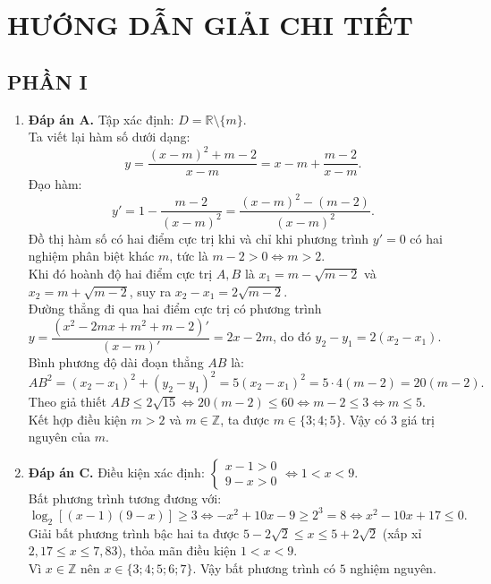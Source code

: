 \documentclass[12pt,a4paper]{article}
\begin{document}
\newpage
\section*{HƯỚNG DẪN GIẢI CHI TIẾT}

\subsection*{PHẦN I}
\begin{enumerate}[label=\textbf{Câu \arabic*:}, leftmargin=*]

\item \textbf{Đáp án A.}
Tập xác định: $D = \mathbb{R} \setminus \{m\}$.\\
Ta viết lại hàm số dưới dạng:
$$y = \dfrac{(x - m)^2 + m - 2}{x - m} = x - m + \dfrac{m - 2}{x - m}.$$
Đạo hàm:
$$y' = 1 - \dfrac{m - 2}{(x - m)^2} = \dfrac{(x - m)^2 - (m - 2)}{(x - m)^2}.$$
Đồ thị hàm số có hai điểm cực trị khi và chỉ khi phương trình $y' = 0$ có hai nghiệm phân biệt khác $m$, tức là $m - 2 > 0 \iff m > 2$.\\
Khi đó hoành độ hai điểm cực trị $A, B$ là $x_1 = m - \sqrt{m - 2}$ và $x_2 = m + \sqrt{m - 2}$, suy ra $x_2 - x_1 = 2\sqrt{m - 2}$.\\
Đường thẳng đi qua hai điểm cực trị có phương trình $y = \dfrac{(x^2 - 2mx + m^2 + m - 2)'}{(x - m)'} = 2x - 2m$, do đó $y_2 - y_1 = 2(x_2 - x_1)$.\\
Bình phương độ dài đoạn thẳng $AB$ là:
$$AB^2 = (x_2 - x_1)^2 + (y_2 - y_1)^2 = 5(x_2 - x_1)^2 = 5 \cdot 4(m - 2) = 20(m - 2).$$
Theo giả thiết $AB \le 2\sqrt{15} \iff 20(m - 2) \le 60 \iff m - 2 \le 3 \iff m \le 5$.\\
Kết hợp điều kiện $m > 2$ và $m \in \mathbb{Z}$, ta được $m \in \{3; 4; 5\}$. Vậy có $3$ giá trị nguyên của $m$.

\item \textbf{Đáp án C.}
Điều kiện xác định: $\begin{cases} x - 1 > 0 \\ 9 - x > 0 \end{cases} \iff 1 < x < 9$.\\
Bất phương trình tương đương với:
$$\log_2\left[(x - 1)(9 - x)\right] \ge 3 \iff -x^2 + 10x - 9 \ge 2^3 = 8 \iff x^2 - 10x + 17 \le 0.$$
Giải bất phương trình bậc hai ta được $5 - 2\sqrt{2} \le x \le 5 + 2\sqrt{2}$ (xấp xỉ $2{,}17 \le x \le 7{,}83$), thỏa mãn điều kiện $1 < x < 9$.\\
Vì $x \in \mathbb{Z}$ nên $x \in \{3; 4; 5; 6; 7\}$. Vậy bất phương trình có $5$ nghiệm nguyên.


\end{enumerate}
\end{document}
